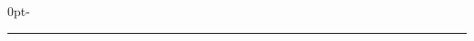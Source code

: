\begin{titlingpage*}
\begin{adjustwidth*}{0pt}{\dimexpr\spinemargin-\foremargin\relax}
  \centering
  \vspace*{0.2\textheight}
  {\fontsize{18}{22}\selectfont\booktitletop\par}
  \vspace{2pt}
  {\fontsize{54}{58}\selectfont\booktitlemain\par}
  \vspace{1\onelineskip}
  {\color{taoaccent}\rule{0.3\textwidth}{0.6pt}\par}
  \vspace{1\onelineskip}
  {\large\itshape\booksubtitle\par}
  \vfill
  {\large\scshape\bookauthor\par}
  \vspace*{0.1\textheight}
\end{adjustwidth*}
\end{titlingpage*}
